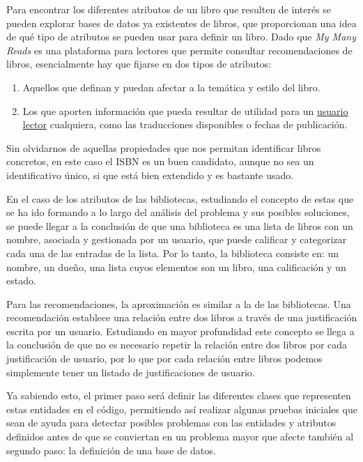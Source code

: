 Para encontrar los diferentes atributos de un libro que resulten de interés se pueden explorar bases de datos ya existentes de libros, que proporcionan una idea de qué tipo de atributos se pueden usar para definir un libro. Dado que \textit{My Many Reads} es una plataforma para lectores que permite consultar recomendaciones de libros, esencialmente hay que fijarse en dos tipos de atributos: 

\begin{enumerate}
    \item Aquellos que definan y puedan afectar a la temática y estilo del libro.
    \item Los que aporten información que pueda resultar de utilidad para un \hyperref[usuario lector]{\underline{usuario lector}} cualquiera, como las traducciones disponibles o fechas de publicación.
\end{enumerate}

Sin olvidarnos de aquellas propiedades que nos permitan identificar libros concretos, en este caso el ISBN es un buen candidato, aunque no sea un identificativo único, si que está bien extendido y es bastante usado.

En el caso de los atributos de las bibliotecas, estudiando el concepto de estas que se ha ido formando a lo largo del análisis del problema y sus posibles soluciones, se puede llegar a la conclusión de que una biblioteca es una lista de libros con un nombre, asociada y gestionada por un usuario, que puede calificar y categorizar cada una de las entradas de la lista. Por lo tanto, la biblioteca consiste en: un nombre, un dueño, una lista cuyos elementos son un libro, una calificación y un estado.

Para las recomendaciones, la aproximación es similar a la de las bibliotecas. Una recomendación establece una relación entre dos libros a través de una justificación escrita por un usuario. Estudiando en mayor profundidad este concepto se llega a la conclusión de que no es necesario repetir la relación entre dos libros por cada justificación de usuario, por lo que por cada relación entre libros podemos simplemente tener un listado de justificaciones de usuario.

Ya sabiendo esto, el primer paso será definir las diferentes clases que representen estas entidades en el código, permitiendo así realizar algunas pruebas iniciales que sean de ayuda para detectar posibles problemas con las entidades y atributos definidos antes de que se conviertan en un problema mayor que afecte también al segundo paso: la definición de una base de datos.

